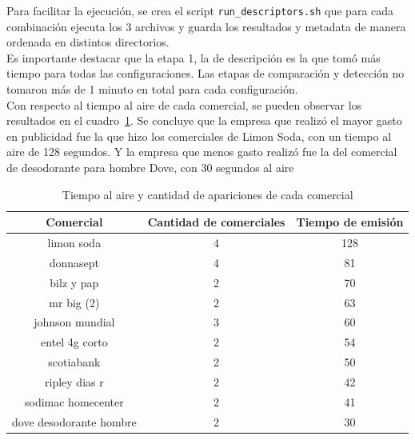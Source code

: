 \documentclass[14pt,letterpaper,hidelinks]{extarticle}
\begin{document}
Para facilitar la ejecución, se crea el script \verb+run_descriptors.sh+ que para cada combinación ejecuta los 3 archivos y guarda los resultados y metadata de manera ordenada en distintos directorios.\\

Es importante destacar que la etapa 1, la de descripción es la que tomó más tiempo para todas las configuraciones. Las etapas de comparación y detección no tomaron más de 1 minuto en total para cada configuración.\\

Con respecto al tiempo al aire de cada comercial, se pueden observar los resultados en el cuadro~\ref{tab:tiempoAlAire}.
Se concluye que la empresa que realizó el mayor gasto en publicidad fue la que hizo los comerciales de Limon Soda, con un tiempo al aire de 128 segundos. Y la empresa que menos gasto realizó fue la del comercial de desodorante para hombre Dove, con 30 segundos al aire

\begin{table}[ht!]
\centering
\begin{tabular}{@{}ccc@{}}
\toprule
Comercial               & Cantidad de comerciales & Tiempo de emisión \\ \midrule
limon soda              & 4                       & 128               \\
donnasept               & 4                       & 81                \\
bilz y pap              & 2                       & 70                \\
mr big (2)              & 2                       & 63                \\
johnson mundial         & 3                       & 60                \\
entel 4g corto          & 2                       & 54                \\
scotiabank              & 2                       & 50                \\
ripley dias r           & 2                       & 42                \\
sodimac homecenter      & 2                       & 41                \\
dove desodorante hombre & 2                       & 30                \\ \bottomrule
\end{tabular}
\captionsetup{justification=centering,margin=2cm}
\caption{Tiempo al aire y cantidad de apariciones de cada comercial\label{tab:tiempoAlAire}}
\end{table}
\end{document}
